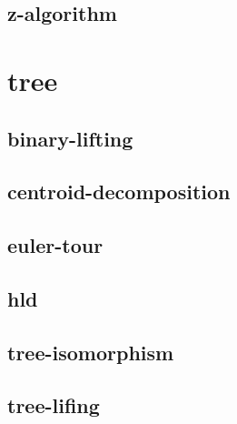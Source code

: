 \documentclass[a4paper, twocolumn]{article}
\begin{document}
\subsection{z-algorithm}

\section{tree}
\subsection{binary-lifting}

\subsection{centroid-decomposition}

\subsection{euler-tour}

\subsection{hld}

\subsection{tree-isomorphism}

\subsection{tree-lifing}

\end{document}
